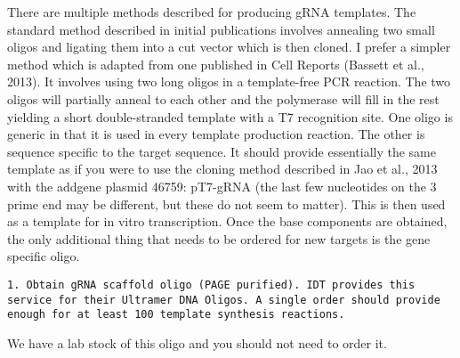 \documentclass[
  letterpaper,
  DIV=11,
  numbers=noendperiod]{scrreprt}
\begin{document}
\begin{tcolorbox}[enhanced jigsaw, toprule=.15mm, breakable, coltitle=black, leftrule=.75mm, title=\textcolor{quarto-callout-note-color}{\faInfo}\hspace{0.5em}{Notes}, bottomrule=.15mm, toptitle=1mm, bottomtitle=1mm, colframe=quarto-callout-note-color-frame, opacityback=0, colback=white, opacitybacktitle=0.6, colbacktitle=quarto-callout-note-color!10!white, rightrule=.15mm, titlerule=0mm, arc=.35mm, left=2mm]

There are multiple methods described for producing gRNA templates. The
standard method described in initial publications involves annealing two
small oligos and ligating them into a cut vector which is then cloned. I
prefer a simpler method which is adapted from one published in Cell
Reports (Bassett et al., 2013). It involves using two long oligos in a
template-free PCR reaction. The two oligos will partially anneal to each
other and the polymerase will fill in the rest yielding a short
double-stranded template with a T7 recognition site. One oligo is
generic in that it is used in every template production reaction. The
other is sequence specific to the target sequence. It should provide
essentially the same template as if you were to use the cloning method
described in Jao et al., 2013 with the addgene plasmid 46759: pT7-gRNA
(the last few nucleotides on the 3 prime end may be different, but these
do not seem to matter). This is then used as a template for in vitro
transcription. Once the base components are obtained, the only
additional thing that needs to be ordered for new targets is the gene
specific oligo.

\end{tcolorbox}

\begin{verbatim}
1. Obtain gRNA scaffold oligo (PAGE purified). IDT provides this service for their Ultramer DNA Oligos. A single order should provide enough for at least 100 template synthesis reactions.  
\end{verbatim}

\begin{tcolorbox}[enhanced jigsaw, toprule=.15mm, breakable, coltitle=black, leftrule=.75mm, title=\textcolor{quarto-callout-note-color}{\faInfo}\hspace{0.5em}{Notes}, bottomrule=.15mm, toptitle=1mm, bottomtitle=1mm, colframe=quarto-callout-note-color-frame, opacityback=0, colback=white, opacitybacktitle=0.6, colbacktitle=quarto-callout-note-color!10!white, rightrule=.15mm, titlerule=0mm, arc=.35mm, left=2mm]

We have a lab stock of this oligo and you should not need to order it.

\end{tcolorbox}
\end{document}
